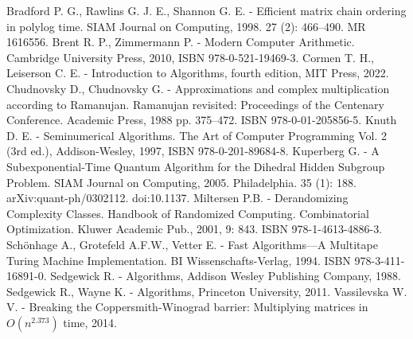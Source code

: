 \documentclass{article}
\begin{document}
\begin{thebibliography}{10}
	 Bradford P. G., Rawlins G. J. E., Shannon G. E. - Efficient matrix chain ordering in polylog time. SIAM Journal on Computing, 1998. 27 (2): 466–490. MR 1616556.
	 Brent R. P., Zimmermann P. - Modern Computer Arithmetic. Cambridge University Press, 2010, ISBN 978-0-521-19469-3.
	 Cormen T. H., Leiserson C. E. - Introduction to Algorithms, fourth edition, MIT Press, 2022.
	 Chudnovsky D., Chudnovsky G. - Approximations and complex multiplication according to Ramanujan. Ramanujan revisited: Proceedings of the Centenary Conference. Academic Press, 1988 pp. 375–472. ISBN 978-0-01-205856-5.
	 Knuth D. E. - Seminumerical Algorithms. The Art of Computer Programming Vol. 2 (3rd ed.), Addison-Wesley, 1997, ISBN 978-0-201-89684-8.
	 Kuperberg G. - A Subexponential-Time Quantum Algorithm for the Dihedral Hidden Subgroup Problem. SIAM Journal on Computing, 2005. Philadelphia. 35 (1): 188. arXiv:quant-ph/0302112. doi:10.1137.
	 Miltersen P.B.  - Derandomizing Complexity Classes. Handbook of Randomized Computing. Combinatorial Optimization. Kluwer Academic Pub., 2001,  9: 843. ISBN 978-1-4613-4886-3.
	 Schönhage A., Grotefeld A.F.W., Vetter E. - Fast Algorithms—A Multitape Turing Machine Implementation. BI Wissenschafts-Verlag, 1994. ISBN 978-3-411-16891-0.
	 Sedgewick R. - Algorithms, Addison Wesley Publishing Company, 1988.
	 Sedgewick R., Wayne K. - Algorithms, Princeton University, 2011.
	 Vassilevska W. V. - Breaking the Coppersmith-Winograd barrier: Multiplying matrices in $O(n^{2.373})$ time, 2014.
\end{thebibliography}
\end{document}
